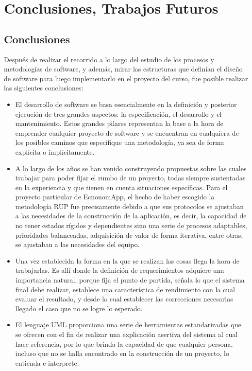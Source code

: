 \chapter{Conclusiones, Trabajos Futuros}

\section{Conclusiones}
Después de realizar el recorrido a lo largo del estudio de los procesos y metodologías de software, y además, mirar las estructuras que definían el diseño de software para luego implementarlo en el proyecto del curso, fue posible realizar las siguientes conclusiones:
\begin{itemize}
	\item El desarrollo de software se basa esencialmente en la definición y posterior ejecución de tres grandes aspectos: la especificación, el desarrollo y el mantenimiento. Estos grandes pilares representan la base a la hora de emprender cualquier proyecto de software y se encuentran en cualquiera de los posibles caminos que especifique una metodología, ya sea de forma explícita o implícitamente.  
	
	\item A lo largo de los años se han venido construyendo propuestas sobre las cuales trabajar para poder fijar el rumbo de un proyecto, todas siempre sustentadas en la experiencia y que tienen en cuenta situaciones específicas. Para el proyecto particular de EcnonomApp, el hecho de haber escogido la metodología RUP fue precisamente debido a que sus protocolos se ajustaban a las necesidades de la construcción de la aplicación, es decir, la capacidad de no tener estados rígidos y dependientes sino una serie de procesos adaptables, prioridades balanceadas, adquisición de valor de forma iterativa, entre otras, se ajustaban a las necesidades del equipo.
	
	\item Una vez establecida la forma en la que se realizan las cosas llega la hora de trabajarlas. Es allí donde la definición de requerimientos adquiere una importancia natural, porque fija el punto de partida, señala lo que el sistema final debe realizar, establece una característica de rendimiento con la cual evaluar el resultado, y desde la cual establecer las correcciones necesarias llegado el caso que no se logre lo esperado.
	
	\item El lenguaje UML proporciona una serie de herramientas estandarizadas que se ofrecen con el fin de realizar una explicación asertiva del sistema al cual hace referencia, por lo que brinda la capacidad de que cualquier persona, incluso que no se halla encontrado en la construcción de un proyecto, lo entienda e interprete.
	

\end{itemize}
